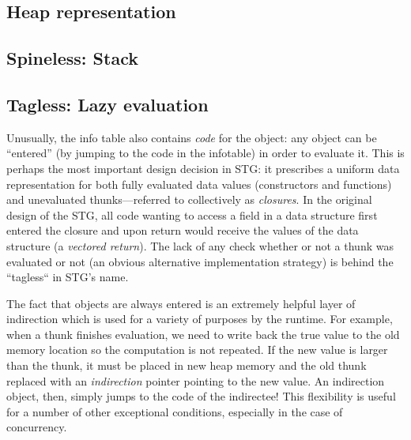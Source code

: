 \subsection{Heap representation}

\subsection{Spineless: Stack}





\subsection{Tagless: Lazy evaluation}

Unusually, the info table also contains \emph{code} for the object: any
object can be ``entered'' (by jumping to the code in the infotable) in
order to evaluate it.  This is perhaps the most important design
decision in STG: it prescribes a uniform data representation for both
fully evaluated data values (constructors and functions) and unevaluated
thunks---referred to collectively as \emph{closures}.  In the original
design of the STG, all code wanting to access a field in a data
structure first entered the closure and upon return would receive the
values of the data structure (a \emph{vectored return}).  The lack of
any check whether or not a thunk was evaluated or not (an obvious
alternative implementation strategy) is behind the ``tagless`` in STG's
name.



The fact that objects are always entered is an extremely helpful layer
of indirection which is used for a variety of purposes by the runtime.
For example, when a thunk finishes evaluation, we need to write back the
true value to the old memory location so the computation is not
repeated.  If the new value is larger than the thunk, it must be placed
in new heap memory and the old thunk replaced with an \emph{indirection}
pointer pointing to the new value.  An indirection object, then, simply
jumps to the code of the indirectee!  This flexibility is useful for a
number of other exceptional conditions, especially in the case of
concurrency.

